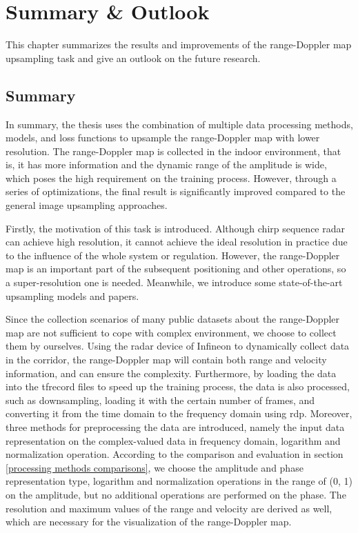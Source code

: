 \chapter{Summary \& Outlook} \label{summary and outlook}
This chapter summarizes the results and improvements of the range-Doppler map upsampling task and give an outlook on the future research.

\section{Summary} \label{summary}
In summary, the thesis uses the combination of multiple data processing methods, models, and loss functions to upsample the range-Doppler map with lower resolution. The range-Doppler map is collected in the indoor environment, that is, it has more information and the dynamic range of the amplitude is wide, which poses the high requirement on the training process. However, through a series of optimizations, the final result is significantly improved compared to the general image upsampling approaches.

Firstly, the motivation of this task is introduced. Although chirp sequence radar can achieve high resolution, it cannot achieve the ideal resolution in practice due to the influence of the whole system or regulation. However, the range-Doppler map is an important part of the subsequent positioning and other operations, so a super-resolution one is needed. Meanwhile, we introduce some state-of-the-art upsampling models and papers.

Since the collection scenarios of many public datasets about the range-Doppler map are not sufficient to cope with complex environment, we choose to collect them by ourselves. Using the radar device of Infineon to dynamically collect data in the corridor, the range-Doppler map will contain both range and velocity information, and can ensure the complexity. Furthermore, by loading the data into the \gls{tfrecord} files to speed up the training process, the data is also processed, such as downsampling, loading it with the certain number of frames, and converting it from the time domain to the frequency domain using \gls{rdp}. Moreover, three methods for preprocessing the data are introduced, namely the input data representation on the complex-valued data in frequency domain, logarithm and normalization operation. According to the comparison and evaluation in section \ref{processing methods comparisons}, we choose the amplitude and phase representation type, logarithm and normalization operations in the range of (0, 1) on the amplitude, but no additional operations are performed on the phase. The resolution and maximum values of the range and velocity are derived as well, which are necessary for the visualization of the range-Doppler map.


